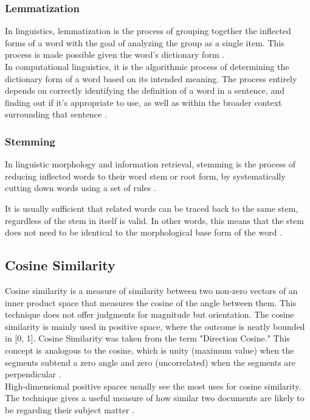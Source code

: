 \documentclass[10pt,11pt,12pt,oneside]{book}
\begin{document}
		\subsubsection{Lemmatization}
		In linguistics, lemmatization is the process of grouping together the inflected forms of a word with the goal of analyzing the group as a single item. This process is made possible given the word's dictionary form \cite{Mller2015}.\\
		
		In computational linguistics, it is the algorithmic process of determining the dictionary form of a word based on its intended meaning. The process entirely depends on correctly identifying the definition of a word in a sentence, and finding out if it's appropriate to use, as well as within the broader context surrounding that sentence \cite{Mller2015}.
		
		
		\subsubsection{Stemming}
		In linguistic morphology and information retrieval, stemming is the process of reducing inflected words to their word stem or root form, by systematically cutting down words using a set of rules \cite{lovins1968development}.
		 
		It is usually sufficient that related words can be traced back to the same stem, regardless of the stem in itself is valid. In other words, this means that the stem does not need to be identical to the morphological base form of the word \cite{lovins1968development}.
	
	\subsection{Cosine Similarity}
		Cosine similarity is a measure of similarity between two non-zero vectors of an inner product space that measures the cosine of the angle between them. This technique does not offer judgments for magnitude but orientation.  The cosine similarity is mainly used in positive space, where the outcome is neatly bounded in [0, 1]. Cosine Similarity was taken from the term "Direction Cosine." This concept is analogous to the cosine, which is unity (maximum value) when the segments subtend a zero angle and zero (uncorrelated) when the segments are perpendicular \cite{singhal2001modern}.\\
		
		High-dimensional positive spaces usually see the most uses for cosine similarity. The technique gives a useful measure of how similar two documents are likely to be regarding their subject matter \cite{singhal2001modern}.\\
		
\end{document}
